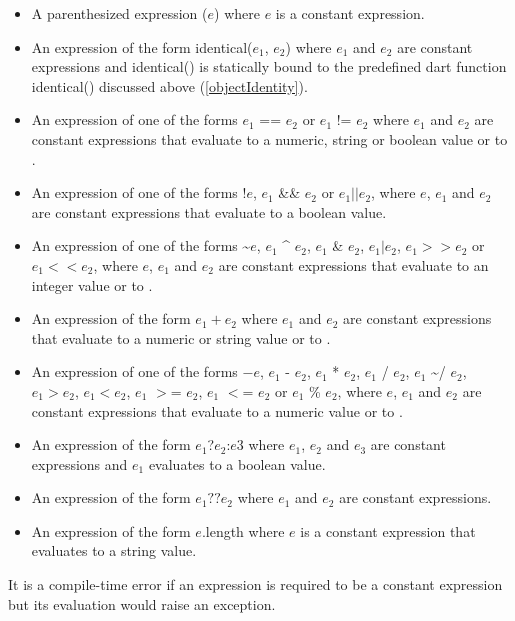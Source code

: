 \documentclass{article}
\newcommand{\code}[1]{{\sf #1}}
\begin{document}
\begin{itemize}
\item A parenthesized expression \code{($e$)} where $e$ is a constant expression.
\item An expression of the form \code{identical($e_1$, $e_2$)} where $e_1$ and $e_2$ are constant expressions  and \code{identical()} is statically bound to the predefined dart function   \code{identical()} discussed above (\ref{objectIdentity}).
\item An expression of one of the forms  \code{$e_1$ == $e_2$} or  \code{$e_1$ != $e_2$} where $e_1$ and $e_2$ are constant expressions that evaluate to a numeric, string or boolean value or to \NULL{}.
\item An expression of one of the forms \code{!$e$}, \code{$e_1$ \&\& $e_2$} or \code{$e_1 || e_2$}, where  $e$, $e_1$ and $e_2$ are constant expressions that evaluate to a boolean value.
\item An expression of one of the forms \~{}$e$, $e_1$ \^{} $e_2$, \code{$e_1$ \& $e_2$}, $e_1 | e_2$, $e_1 >> e_2$ or $e_1 <<  e_2$, where  $e$, $e_1$ and $e_2$ are constant expressions that evaluate to an integer value  or to \NULL{}.
\item An expression of the form \code{$e_1 + e_2$} where $e_1$ and $e_2$ are constant expressions that evaluate to a numeric or string value or to \NULL{}.
\item An expression of one of the forms \code{$-e$}, \code{$e_1$ - $e_2$}, \code{$e_1$ * $e_2$}, \code{$e_1$ / $e_2$,} \code{$e_1$ \~{}/ $e_2$},  \code{$e_1  >  e_2$}, \code{$e_1  <  e_2$}, \code{$e_1$ $>$= $e_2$}, \code{$e_1$ $<$= $e_2$} or \code{$e_1$ \% $e_2$},  where $e$, $e_1$ and $e_2$ are constant expressions that evaluate to a numeric value  or to \NULL{}.
\item An expression of the form \code{$e_1$?$e_2$:$e3$} where $e_1$, $e_2$ and $e_3$ are constant expressions and $e_1$ evaluates to a boolean value.
\item An expression of the form \code{$e_1 ?? e_2$} where $e_1$ and $e_2$ are constant expressions.
\item An expression of the form \code{$e$.length} where $e$ is a constant expression that evaluates to a string value.
\end{itemize}



\LMHash{}
It is a compile-time error if an expression is required to be a constant expression but its evaluation  would raise an exception.
\end{document}
